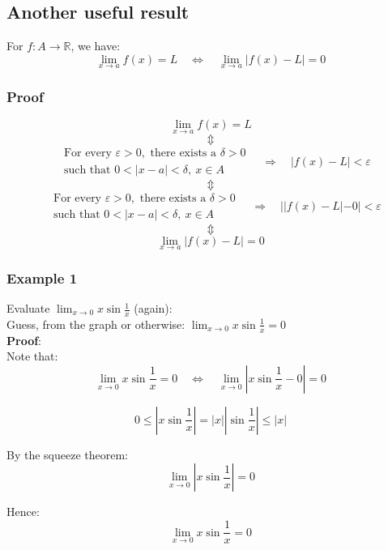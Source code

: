 \documentclass[11pt]{article}
\begin{document}
\subsection{Another useful result}
\label{sec:org678ca14}
For \(f : A \rightarrow \mathbb{R}\), we have:
\[\lim_{x \rightarrow a} f(x) = L \quad \Leftrightarrow \quad \lim_{x \rightarrow a} |f(x) - L| = 0\]

\subsubsection{Proof}
\label{sec:org483b393}
\[\lim_{x \rightarrow a} f(x) = L\]
\[\Updownarrow\]
\[\begin{aligned} &\text{For every } \varepsilon > 0, \text{ there exists a } \delta > 0 \\
&\text{such that } 0 < |x - a| < \delta, \ x \in A
\end{aligned} \quad \Rightarrow \quad |f(x) - L| < \varepsilon\]
\[\Updownarrow\]
\[\begin{aligned} &\text{For every } \varepsilon > 0, \text{ there exists a } \delta > 0 \\
&\text{such that } 0 < |x - a| < \delta, \ x \in A
\end{aligned} \quad \Rightarrow \quad ||f(x) - L| - 0| < \varepsilon\]
\[\Updownarrow\]
\[\lim_{x \rightarrow a}|f(x) - L| = 0\]


\subsubsection{Example 1}
\label{sec:org93d8956}
Evaluate \(\lim_{x \rightarrow 0} x \sin \frac{1}{x}\) (again):
\\[0pt]

Guess, from the graph or otherwise: \(\lim_{x \rightarrow 0} x \sin \frac{1}{x} = 0\)
\\[0pt]

\textbf{Proof}:
\\[0pt]

Note that:
\[\lim_{x \rightarrow 0} x \sin \frac{1}{x} = 0 \quad \Leftrightarrow \quad \lim_{x \rightarrow 0} \left|x \sin \frac{1}{x} - 0 \right| = 0\]

\[0 \leq \left|x \sin \frac{1}{x} \right| = |x| \left|\sin \frac{1}{x} \right| \leq |x|\]

By the squeeze theorem:
\[\lim_{x \rightarrow 0} \left|x \sin \frac{1}{x} \right| = 0\]

Hence:
\[\lim_{x \rightarrow 0} x \sin \frac{1}{x} = 0\]
\end{document}
